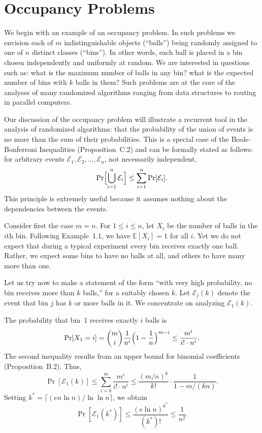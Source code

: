 \documentclass[twoside,12pt]{book}
\theoremstyle{plain}
\theoremstyle{definition}
\theoremstyle{remark}
\begin{document}
\section{Occupancy Problems}
\label{sec:occupancy}

We begin with an example of an occupancy problem. In such problems we envision each of $m$ indistinguishable objects (``balls'') being randomly assigned to one of $n$ distinct classes (``bins''). In other words, each ball is placed in a bin chosen independently and uniformly at random. We are interested in questions such as: what is the maximum number of balls in any bin? what is the expected number of bins with $k$ balls in them? Such problems are at the core of the analyses of many randomized algorithms ranging from data structures to routing in parallel computers.

Our discussion of the occupancy problem will illustrate a recurrent tool in the analysis of randomized algorithms: that the probability of the union of events is no more than the sum of their probabilities. This is a special case of the Boole--Bonferroni Inequalities (Proposition~C.2) and can be formally stated as follows: for arbitrary events $\mathcal{E}_1, \mathcal{E}_2, \ldots, \mathcal{E}_n$, not necessarily independent,
\[
\Pr\Bigl[\bigcup_{i=1}^{n} \mathcal{E}_i\Bigr] \leq \sum_{i=1}^{n} \Pr[\mathcal{E}_i].
\]
This principle is extremely useful because it assumes nothing about the dependencies between the events.

Consider first the case $m = n$. For $1 \leq i \leq n$, let $X_i$ be the number of balls in the $i$th bin. Following Example~1.1, we have $\mathbb{E}[X_i] = 1$ for all $i$. Yet we do not expect that during a typical experiment every bin receives exactly one ball. Rather, we expect some bins to have no balls at all, and others to have many more than one.

Let us try now to make a statement of the form ``with very high probability, no bin receives more than $k$ balls,'' for a suitably chosen $k$. Let $\mathcal{E}_j(k)$ denote the event that bin $j$ has $k$ or more balls in it. We concentrate on analyzing $\mathcal{E}_1(k)$.

The probability that bin~1 receives exactly $i$ balls is
\[
\Pr[X_1 = i] = \binom{m}{i} \frac{1}{n^i}\Bigl(1 - \frac{1}{n}\Bigr)^{m-i} \leq \frac{m^i}{i! \cdot n^i}.
\]
The second inequality results from an upper bound for binomial coefficients (Proposition~B.2). Thus,
\[
\Pr[\mathcal{E}_1(k)] \leq \sum_{i=k}^{m} \frac{m^i}{i! \cdot n^i} \leq \frac{(m/n)^k}{k!} \cdot \frac{1}{1 - m/(kn)}.
\]
Setting $k^* = \lceil (en \ln n) / \ln \ln n \rceil$, we obtain
\begin{equation}
\Pr[\mathcal{E}_1(k^*)] \leq \frac{(e \ln n)^{k^*}}{(k^*)!} \leq \frac{1}{n^2}.
\label{eq:occ-bound}
\end{equation}
\end{document}
